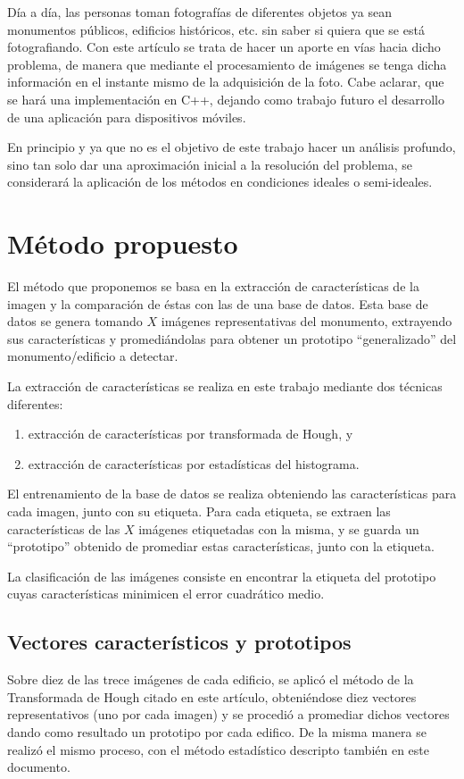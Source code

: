 \documentclass[conference,spanish,a4paper,10pt,oneside,final]{tfmpd}
\begin{document}
Día a día, las personas toman fotografías de diferentes objetos ya sean
monumentos públicos, edificios históricos, etc. sin saber si quiera que se
está fotografiando. Con este artículo se trata de hacer un aporte en vías
hacia dicho problema, de manera que mediante el procesamiento de imágenes se
tenga dicha información en el instante mismo de la adquisición de la foto.
Cabe aclarar, que se hará una implementación en C++, dejando como trabajo
futuro el desarrollo de una aplicación para dispositivos móviles.

En principio y ya que no es el objetivo de este trabajo hacer un análisis
profundo, sino tan solo dar una aproximación inicial a la resolución del
problema, se considerará la aplicación de los métodos en condiciones
ideales o semi-ideales. 
%
%
%
%
\section{Método propuesto}
El método que proponemos se basa en la extracción de características de la
imagen y la comparación de éstas con las de una base de datos.
Esta base de datos se genera tomando $X$ imágenes representativas del monumento,
extrayendo sus características y promediándolas para obtener un prototipo
``generalizado'' del monumento/edificio a detectar.

La extracción de características se realiza en este trabajo mediante dos
técnicas diferentes:
\begin{enumerate}
\item extracción de características por transformada de Hough, y
\item extracción de características por estadísticas del histograma.
\end{enumerate}

El entrenamiento de la base de datos se realiza obteniendo las características
para cada imagen, junto con su etiqueta. Para cada etiqueta, se extraen las
características de las $X$ imágenes etiquetadas con la misma, y se guarda un
``prototipo'' obtenido de promediar estas características, junto con la
etiqueta.

La clasificación de las imágenes consiste en encontrar la etiqueta del
prototipo cuyas características minimicen el error cuadrático medio.

\subsection*{Vectores característicos y prototipos}
Sobre diez de las trece imágenes de cada edificio, se aplicó el método de la Transformada de Hough citado en este artículo, obteniéndose diez vectores representativos (uno por cada imagen) y se procedió a promediar dichos vectores dando como resultado un prototipo por cada edifico. De la misma manera se realizó el mismo proceso, con el método estadístico descripto también en este documento.
\end{document}
